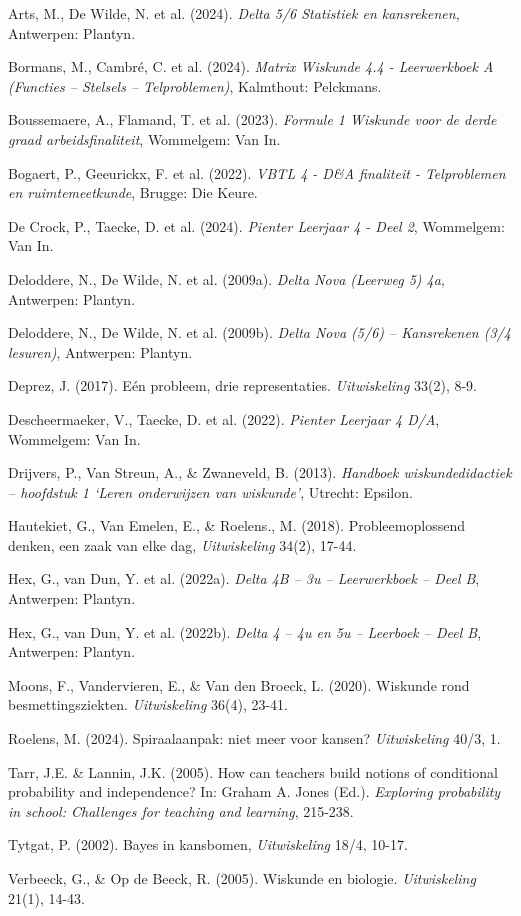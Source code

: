\begin{bronnen}
    \item Arts, M., De Wilde, N. et al. (2024). \emph{Delta 5/6 Statistiek en kansrekenen}, Antwerpen: Plantyn.
    \item Bormans, M., Cambré, C. et al. (2024). \emph{Matrix Wiskunde 4.4 - Leerwerkboek A (Functies – Stelsels – Telproblemen)}, Kalmthout: Pelckmans.
    \item Boussemaere, A., Flamand, T. et al. (2023). \emph{Formule 1 Wiskunde voor de derde graad arbeidsfinaliteit}, Wommelgem: Van In.
    \item Bogaert, P., Geeurickx, F. et al. (2022). \emph{VBTL 4 - D\&A finaliteit - Telproblemen en ruimtemeetkunde}, Brugge: Die Keure.
    \item De Crock, P., Taecke, D. et al. (2024). \emph{Pienter Leerjaar 4 - Deel 2}, Wommelgem: Van In.
    \item Deloddere, N., De Wilde, N. et al. (2009a). \emph{Delta Nova (Leerweg 5) 4a}, Antwerpen: Plantyn.
    \item Deloddere, N., De Wilde, N. et al. (2009b). \emph{Delta Nova (5/6) – Kansrekenen (3/4 lesuren)}, Antwerpen: Plantyn.
    \item Deprez, J. (2017). Eén probleem, drie representaties. \emph{Uitwiskeling} 33(2), 8-9.
    \item Descheermaeker, V., Taecke, D. et al. (2022). \emph{Pienter Leerjaar 4 D/A}, Wommelgem: Van In.
    \item Drijvers, P., Van Streun, A., \& Zwaneveld, B. (2013). \emph{Handboek wiskundedidactiek – hoofdstuk 1 ‘Leren onderwijzen van wiskunde'}, Utrecht: Epsilon.
    \item Hautekiet, G., Van Emelen, E., \& Roelens., M. (2018). Probleemoplossend denken, een zaak van elke dag, \emph{Uitwiskeling} 34(2), 17-44.
    \item Hex, G., van Dun, Y. et al. (2022a). \emph{Delta 4B – 3u – Leerwerkboek – Deel B}, Antwerpen: Plantyn.    
    \item Hex, G., van Dun, Y. et al. (2022b). \emph{Delta 4 – 4u en 5u – Leerboek – Deel B}, Antwerpen: Plantyn.
    \item Moons, F., Vandervieren, E., \& Van den Broeck, L. (2020). Wiskunde rond besmettingsziekten. \emph{Uitwiskeling} 36(4), 23-41.
    \item Roelens, M. (2024). Spiraalaanpak: niet meer voor kansen? \emph{Uitwiskeling} 40/3, 1.
    \item Tarr, J.E. \& Lannin, J.K. (2005). How can teachers build notions of conditional probability and independence? In: Graham A. Jones (Ed.). \emph{Exploring probability in school: Challenges for teaching and learning}, 215-238.
    \item Tytgat, P. (2002). Bayes in kansbomen, \emph{Uitwiskeling} 18/4, 10-17.
    \item Verbeeck, G., \& Op de Beeck, R. (2005). Wiskunde en biologie. \emph{Uitwiskeling} 21(1), 14-43.


\end{bronnen}
